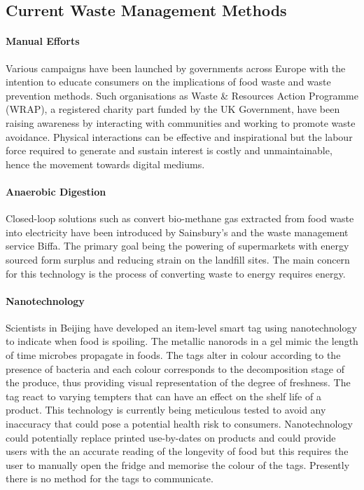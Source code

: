 \documentclass[a4paper, 11pt]{article}
\begin{document}
\vspace{\baselineskip}
\vspace{\baselineskip}
\vspace{\baselineskip}

\subsection{Current Waste Management Methods}

\paragraph{Manual Efforts}
Various campaigns have been launched by governments across Europe with the intention to educate consumers on the implications of food waste and waste prevention methods. Such organisations as Waste \& Resources Action Programme (WRAP), a registered charity part funded by the UK Government, have been raising awareness by interacting with communities and working to promote waste avoidance. Physical interactions can be effective and inspirational but the labour force required to generate and sustain interest is costly and unmaintainable, hence the movement towards digital mediums.

\paragraph{Anaerobic Digestion}
Closed-loop solutions such as convert bio-methane gas extracted from food waste into electricity have been introduced by Sainsbury's and the waste management service Biffa. The primary goal being the powering of supermarkets with energy sourced form surplus and reducing strain on the landfill sites. The main concern for this technology is the process of converting waste to energy requires energy. 

\paragraph{Nanotechnology}
Scientists in Beijing have developed an item-level smart tag using nanotechnology to indicate when food is spoiling. The metallic nanorods in a gel mimic the length of time microbes propagate in foods. The tags alter in colour according to the presence of bacteria and each colour corresponds to the decomposition stage of the produce, thus providing visual representation of the degree of freshness. The tag react to varying tempters that can have an effect on the shelf life of a product. This technology is currently being meticulous tested to avoid any inaccuracy that could pose a potential health risk to consumers. Nanotechnology could potentially replace printed use-by-dates on products and could provide users with the an accurate reading of the longevity of food but this requires the user to manually open the fridge and memorise the colour of the tags. Presently there is no method for the tags to communicate.
\end{document}
